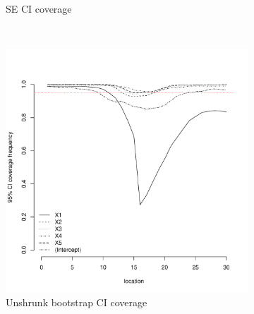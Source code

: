 \documentclass[authoryear, review, 11pt]{elsarticle}
\begin{document}
\begin{figure}
\begin{subfigure}[b]{0.45\textwidth}
		\caption{SE CI coverage}
	\end{subfigure}%
	\\%
	\begin{subfigure}[b]{0.45\textwidth}
	\centering
		\includegraphics[width=\textwidth]{../../figures/simulation/15.25.profile_unshrunk_bootstrap_coverage.pdf}
		\caption{Unshrunk bootstrap CI coverage}
	\end{subfigure}%
	~ %
	\begin{subfigure}[b]{0.45\textwidth}
	\centering

\end{subfigure}
\end{figure}
\end{document}
